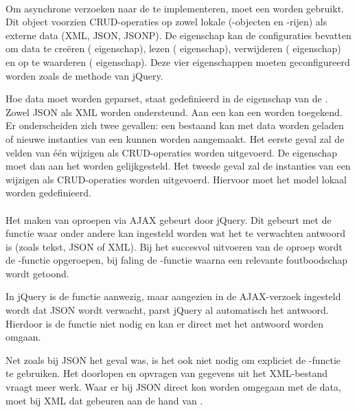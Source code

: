 \paragraph{\kendo}
Om asynchrone verzoeken naar de  te implementeren, moet een  worden gebruikt.
Dit object voorzien CRUD-operaties op zowel lokale (\js-objecten en \js-rijen) als externe data (XML, JSON, JSONP).
De  eigenschap kan de configuraties bevatten om data te creëren ( eigenschap),  lezen ( eigenschap),  verwijderen ( eigenschap) en op te waarderen ( eigenschap).
Deze vier eigenschappen moeten geconfigureerd worden zoals de  methode van jQuery.

Hoe data moet worden geparset, staat gedefinieerd in de  eigenschap van de .
Zowel JSON als XML worden ondersteund.
Aan een  kan een  worden toegekend.
Er onderscheiden zich twee gevallen:  een bestaand  kan met data worden geladen of nieuwe instanties van een  kunnen worden aangemaakt.
Het eerste geval zal de velden van één  wijzigen als CRUD-operaties worden uitgevoerd.
De eigenschap moet dan aan het  worden gelijkgesteld.
Het tweede geval zal de instanties van een  wijzigen als CRUD-operaties worden uitgevoerd.
Hiervoor moet het model lokaal worden gedefinieerd.

\paragraph{\jqm}
Het maken van oproepen via AJAX gebeurt door jQuery. 
Dit gebeurt met de functie  waar onder andere kan ingesteld worden wat het te verwachten antwoord is (zoals tekst, JSON of XML). 
Bij het succesvol uitvoeren van de oproep wordt de -functie opgeroepen, bij faling de -functie waarna een relevante foutboodschap wordt getoond.

In jQuery is de functie  aanwezig, maar aangezien in de AJAX-verzoek ingesteld wordt dat JSON wordt verwacht, parst jQuery al automatisch het antwoord. 
Hierdoor is de functie  niet nodig en kan er direct met het antwoord worden omgaan.

Net zoals bij JSON het geval was, is het ook niet nodig om expliciet de -functie te gebruiken. 
Het doorlopen en opvragen van gegevens uit het XML-bestand vraagt meer werk. 
Waar er bij JSON direct kon worden omgegaan met de data, moet bij XML dat gebeuren aan de hand van .

